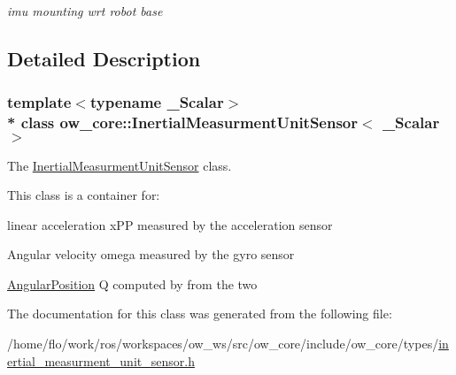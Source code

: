 \begin{DoxyCompactItemize}
\begin{DoxyCompactList}\small\item\em imu mounting wrt robot base \end{DoxyCompactList}\end{DoxyCompactItemize}


\subsection{Detailed Description}
\subsubsection*{template$<$typename \+\_\+\+Scalar$>$\\*
class ow\+\_\+core\+::\+Inertial\+Measurment\+Unit\+Sensor$<$ \+\_\+\+Scalar $>$}

The \hyperlink{classow__core_1_1InertialMeasurmentUnitSensor}{Inertial\+Measurment\+Unit\+Sensor} class. 

This class is a container for\+:
\begin{DoxyItemize}
\item linear acceleration x\+PP measured by the acceleration sensor
\item Angular velocity omega measured by the gyro sensor
\item \hyperlink{classow__core_1_1AngularPosition}{Angular\+Position} Q computed by from the two 
\end{DoxyItemize}

The documentation for this class was generated from the following file\+:\begin{DoxyCompactItemize}
\item 
/home/flo/work/ros/workspaces/ow\+\_\+ws/src/ow\+\_\+core/include/ow\+\_\+core/types/\hyperlink{inertial__measurment__unit__sensor_8h}{inertial\+\_\+measurment\+\_\+unit\+\_\+sensor.\+h}\end{DoxyCompactItemize}
